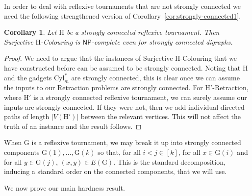 \documentclass[a4paper,12pt]{article}
\newtheorem{corollary}{Corollary}
\theoremstyle{remark}
\newcommand{\NP}[0]{\ensuremath{\mathsf{NP}}}
\newcommand{\Cylm}[0]{\ensuremath{\mathrm{Cyl}^*_m}}
\newcommand{\G}{\ensuremath{\mathrm{G}}}
\renewcommand{\H}{\ensuremath{\mathrm{H}}}
\begin{document}
In order to deal with reflexive tournaments that are not strongly connected we
need the following strengthened version of Corollary~\ref{cor:strongly-connected1}.
\begin{corollary}
Let $\H$ be a strongly connected reflexive tournament. 
Then  {\sc Surjective $\H$-Colouring}
is \NP-complete
even for strongly connected digraphs.
\label{cor:strongly-connected2}
\end{corollary}
\begin{proof}
We need to argue that the instances of {\sc Surjective $\H$-Colouring}
that we have constructed 
before
can be assumed to be strongly connected. Noting that $\H$ and the gadgets $\Cylm$ are strongly connected, this is clear once we can assume the inputs to our Retraction problems are strongly connected. For 
{\sc $\H'$-Retraction},
where $\H'$ is a strongly connected reflexive tournament, we can surely assume our inputs are strongly connected. If they were not, then we add individual directed paths of length $|V(\H')|$ between the relevant vertices. This will not affect the truth of an instance and the result follows.
\end{proof}
When $\G$ is a reflexive tournament, we may break it up into strongly connected components 
$\G(1),\ldots,\G(k)$ so that, for all $i < j \in [k]$, for all $x \in \G(i)$ and for all $y \in \G(j)$, $(x,y) \in E(\G)$. This is the standard decomposition, inducing a standard order on the connected components, that we will use.

We now prove our main hardness result.
\end{document}
